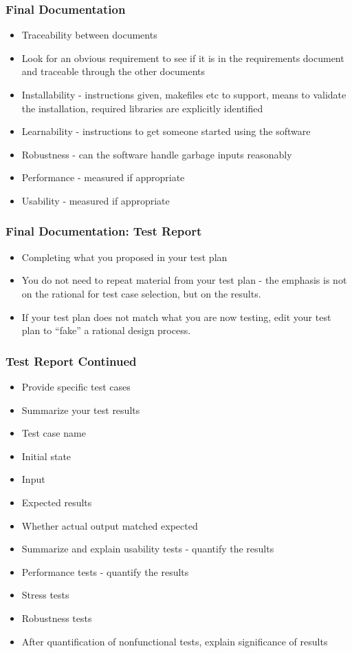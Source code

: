 \documentclass[t,12pt,numbers,fleqn]{beamer}
\begin{document}
\begin{frame}
\frametitle{Final Documentation}
\begin{itemize}
\item Traceability between documents
\item Look for an obvious requirement to see if it is in the requirements
  document and traceable through the other documents
\item Installability - instructions given, makefiles etc to support, means to
  validate the installation, required libraries are explicitly identified
\item Learnability - instructions to get someone started using the software
\item Robustness - can the software handle garbage inputs reasonably
\item Performance - measured if appropriate
\item Usability - measured if appropriate
\end{itemize}
\end{frame}


\begin{frame}
\frametitle{Final Documentation: Test Report}
\begin{itemize}
\item Completing what you proposed in your test plan
\item You do not need to repeat material from your test plan - the emphasis is
  not on the rational for test case selection, but on the results.
\item If your test plan does not match what you are now testing, edit your test
  plan to ``fake'' a rational design process.
\end{itemize}
\end{frame}


\begin{frame}
\frametitle{Test Report Continued}
\begin{itemize}
\item Provide specific test cases
\item Summarize your test results
\bi
\item Test case name
\item Initial state
\item Input
\item Expected results
\item Whether actual output matched expected
\ei
\item Summarize and explain usability tests - quantify the results
\item Performance tests - quantify the results
\item Stress tests
\item Robustness tests
\item After quantification of nonfunctional tests, explain significance of
  results
\end{itemize}
\end{frame}
\end{document}
